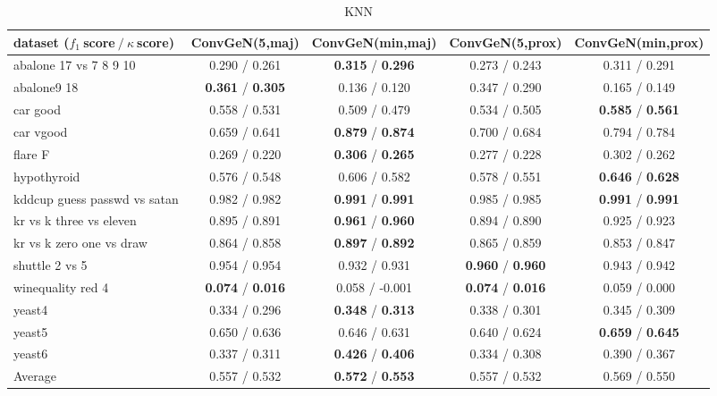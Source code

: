 
\begin{table*}[ht]\scriptsize\caption{KNN}\label{tab:results:KNN:A}\centering\tabularnewline
\begin{tabular}{l|@{\hskip3pt}c@{\hskip3pt}|@{\hskip3pt}c@{\hskip3pt}|@{\hskip3pt}c@{\hskip3pt}|@{\hskip3pt}c@{\hskip3pt}}\hline
\textbf{dataset ($f_1~$score$~/~\kappa~$score)} & \textbf{ConvGeN(5,maj)} & \textbf{ConvGeN(min,maj)} & \textbf{ConvGeN(5,prox)} & \textbf{ConvGeN(min,prox)}
\tabularnewline
\hline
abalone 17 vs 7 8 9 10 &  0.290  /  0.261  &  \textbf{0.315}  /  \textbf{0.296}  &  0.273  /  0.243  &  0.311  /  0.291 
\tabularnewline
abalone9 18 &  \textbf{0.361}  /  \textbf{0.305}  &  0.136  /  0.120  &  0.347  /  0.290  &  0.165  /  0.149 
\tabularnewline
car good &  0.558  /  0.531  &  0.509  /  0.479  &  0.534  /  0.505  &  \textbf{0.585}  /  \textbf{0.561} 
\tabularnewline
car vgood &  0.659  /  0.641  &  \textbf{0.879}  /  \textbf{0.874}  &  0.700  /  0.684  &  0.794  /  0.784 
\tabularnewline
flare F &  0.269  /  0.220  &  \textbf{0.306}  /  \textbf{0.265}  &  0.277  /  0.228  &  0.302  /  0.262 
\tabularnewline
hypothyroid &  0.576  /  0.548  &  0.606  /  0.582  &  0.578  /  0.551  &  \textbf{0.646}  /  \textbf{0.628} 
\tabularnewline
kddcup guess passwd vs satan &  0.982  /  0.982  &  \textbf{0.991}  /  \textbf{0.991}  &  0.985  /  0.985  &  \textbf{0.991}  /  \textbf{0.991} 
\tabularnewline
kr vs k three vs eleven &  0.895  /  0.891  &  \textbf{0.961}  /  \textbf{0.960}  &  0.894  /  0.890  &  0.925  /  0.923 
\tabularnewline
kr vs k zero one vs draw &  0.864  /  0.858  &  \textbf{0.897}  /  \textbf{0.892}  &  0.865  /  0.859  &  0.853  /  0.847 
\tabularnewline
shuttle 2 vs 5 &  0.954  /  0.954  &  0.932  /  0.931  &  \textbf{0.960}  /  \textbf{0.960}  &  0.943  /  0.942 
\tabularnewline
winequality red 4 &  \textbf{0.074}  /  \textbf{0.016}  &  0.058  /  -0.001  &  \textbf{0.074}  /  \textbf{0.016}  &  0.059  /  0.000 
\tabularnewline
yeast4 &  0.334  /  0.296  &  \textbf{0.348}  /  \textbf{0.313}  &  0.338  /  0.301  &  0.345  /  0.309 
\tabularnewline
yeast5 &  0.650  /  0.636  &  0.646  /  0.631  &  0.640  /  0.624  &  \textbf{0.659}  /  \textbf{0.645} 
\tabularnewline
yeast6 &  0.337  /  0.311  &  \textbf{0.426}  /  \textbf{0.406}  &  0.334  /  0.308  &  0.390  /  0.367 
\tabularnewline
\hline Average &  0.557  /  0.532  &  \textbf{0.572}  /  \textbf{0.553}  &  0.557  /  0.532  &  0.569  /  0.550 
\tabularnewline
\hline\end{tabular}\end{table*}


